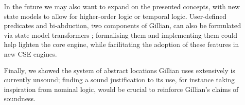In the future we may also want to expand on the presented concepts, with new state models to allow for higher-order logic or temporal logic. User-defined predicates and bi-abduction, two components of Gillian, can also be formulated via state model transformers \cite{sacha-phd}; formalising them and implementing them could help lighten the core engine, while facilitating the adoption of these features in new CSE engines. 

Finally, we showed the system of abstract locations Gillian uses extensively is currently unsound; finding a sound justification to its use, for instance taking inspiration from nominal logic, would be crucial to reinforce Gillian's claims of soundness.
